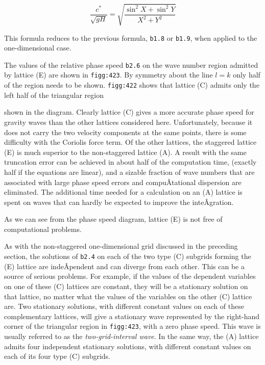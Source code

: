 {\[\frac{c^*}{ \sqrt{gH}} = \sqrt{\frac{\sin^{2}X + \sin^{2}Y}{X^{2} + Y^{2}}}\]}

This formula reduces to the previous formula, \texttt{b1.8} or
\texttt{b1.9}, when applied to the one-dimensional case.

The values of the relative phase speed \texttt{b2.6} on the wave number
region admitted by lattice (E) are shown in \texttt{figg:423}. By
symmetry about the line \(l = k\) only half of the region needs to be
shown. \texttt{figg:422} shows that lattice (C) admits only the left
half of the triangular region


shown in the diagram. Clearly lattice (C) gives a more accurate phase
speed for gravity waves than the other lattices considered here.
Unfortunately, because it does not carry the two velocity components at
the same points, there is some difficulty with the Coriolis force term.
Of the other lattices, the staggered lattice (E) is much superior to the
non-staggered lattice (A). A result with the same truncation error can
be achieved in about half of the computation time, (exactly half if the
equations are linear), and a sizable fraction of wave numbers that are
associated with large phase speed errors and compuÂ­tational dispersion
are eliminated. The additional time needed for a calculation on an (A)
lattice is spent on waves that can hardly be expected to improve the
inteÂ­gration.

As we can see from the phase speed diagram, lattice (E) is not free of
computational problems.

As with the non-staggered one-dimensional grid discussed in the
preceding section, the solutions of \texttt{b2.4} on each of the two
type (C) subgrids forming the (E) lattice are indeÂ­pendent and can
diverge from each other. This can be a source of serious problems. For
example, if the values of the dependent variables on one of these (C)
lattices are constant, they will be a stationary solution on that
lattice, no matter what the values of the variables on the other (C)
lattice are. Two stationary solutions, with different constant values on
each of these complementary lattices, will give a stationary wave
represented by the right-hand corner of the triangular region in
\texttt{figg:423}, with a zero phase speed. This wave is usually
referred to as the \emph{two-grid-interval wave}. In the same way, the
(A) lattice admits four independent stationary solutions, with different
constant values on each of its four type (C) subgrids.

